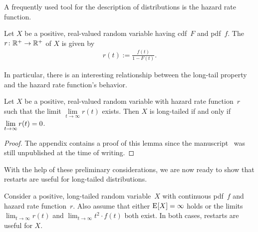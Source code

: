 A frequently used tool for the description of distributions is the hazard rate function.

\begin{definition}
	\label{def:hazard_rate}
	Let $X$ be a positive, real-valued random variable having cdf~$F$ and pdf~$f$.
	The  $r \colon \mathbb{R}^{+} \to \mathbb{R}^{+}$ of $X$ is given by %
		\begin{align*}
			r(t) := \frac{f(t)}{1-F(t)}.
		\end{align*}
\end{definition}

In particular, there is an interesting relationship between the long-tail property and the hazard rate function's behavior.





\begin{restatelemmaorig}
	\label{lem:restateorig}
	\label{lem:appendixlemma}
	Let $X$ be a positive, real-valued random variable with hazard rate function~$r$ such that the limit \mbox{$\lim\limits_{t\rightarrow\infty}r(t)$} exists.
	Then $X$ is long-tailed if and only if \mbox{$\lim\limits_{t \rightarrow \infty} r(t)=0$}.
\end{restatelemmaorig}



\begin{proof}
	The appendix contains a proof of this lemma since the manuscript~\cite{nair2020fundamentals} was still unpublished at the time of writing.
\end{proof}


With the help of these preliminary considerations, we are now ready to show that restarts are useful for long-tailed distributions.

\begin{theorem}
	\label{theo:long_tail_restarts}
	Consider a positive, long-tailed random variable~$X$ with continuous pdf~$f$ and hazard rate function~$r$. 
	Also assume that either \mbox{$\operatorname{\mathrm{E}}_{} [ X ]=\infty$} holds or the limits \mbox{$\lim_{t\rightarrow\infty}r(t)$} and \mbox{$\lim_{t\rightarrow\infty} t^2 \cdot f(t)$} both exist.
	In both cases, restarts are useful for $X$.
\end{theorem}

